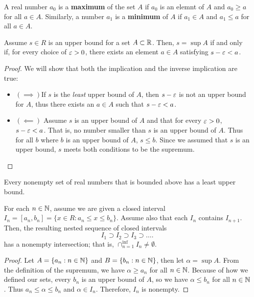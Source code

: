 \begin{definition}
	A real number $a_0$ is a \textbf{maximum} of the set $A$ if $a_0$ is an elemnt of $A$ and $a_0 \ge a$ for all $a \in A$. Similarly, a number $a_1$ is a \textbf{minimum} of $A$ if $a_1 \in A$ and $a_1 \le a$ for all $a \in A$.
\end{definition}


\begin{theorem}
	Assume $s \in R$ is an upper bound for a set $A \subset \mathbb{R}$. Then, $s = \sup A$ if and only if, for every choice of $\e > 0$, there exists an element $a \in A$ satisfying $s - \e < a$.
\end{theorem}

\begin{proof}
       	We will show that both the implication and the inverse implication are true:
	
	\begin{itemize}
		\item $\left( \implies \right) $If $s$ is the \textit{least} upper bound of $A$, then $s - \e$ is not an upper bound for $A $, thus there exists an  $a \in A$ such that $s - \e < a$.
		\item $\left( \impliedby \right) $ Assume $s$ is an upper bound of $A$ and that for every $\e > 0$, $s-\e <a$. That is, no number smaller than $s$ is an upper bound of $A$. Thus for all $b$ where $b$ is an upper bound of $A$, $s \le b$. Since we assumed that $s$ is an upper bound, $s$ meets both conditions to be the supremum. 
	\end{itemize}	
\end{proof}

\begin{axiom}
	Every nonempty set of real numbers that is bounded above has a least upper bound.	
\end{axiom}

\begin{theorem}
	For each $n \in \mathbb{N}$, assume we are given a closed interval $I_n = [a_n, b_n] = \{x \in R : a_n \le x\le b_n\}$. Assume also that each $I_n$ contains $I_{n+1}$. Then, the resulting nested sequence of closed intervals
	\[
	I_1 \supset I_2 \supset I_3 \supset \ldots
	.\] 
	has a nonempty intersection; that is, $\cap_{n=1}^{\inf} I_n \neq \emptyset$.
\end{theorem}

\begin{proof}
	Let $A = \{a_n : n \in \mathbb{N}\}$ and $B = \{b_n : n \in \mathbb{N}\}$, then let $\alpha = \sup A$. From the definition of the supremum, we have  $\alpha \ge a_n$ for all $n \in \mathbb{N}$. Because of how we defined our sets, every  $b_n$ is an upper bound of $A$, so we have $\alpha \le b_n$ for all $n \in \mathbb{N}$. Thus $a_n \le \alpha \le b_n$ and $\alpha \in I_n$. Therefore,  $I_n$ is nonempty.
\end{proof}

